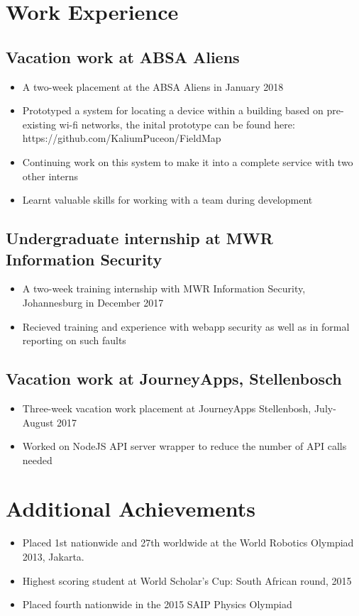 \documentclass[12pt,a4paper,notitlepage]{article}
\begin{document}
\section*{Work Experience}

\subsection*{Vacation work at ABSA Aliens}
\begin{itemize}
\item A two-week placement at the ABSA Aliens in January 2018
\item Prototyped a system for locating a device within a building based on pre-existing wi-fi networks, the inital prototype can be found here: https://github.com/KaliumPuceon/FieldMap
\item Continuing work on this system to make it into a complete service with two other interns
\item Learnt valuable skills for working with a team during development
\end{itemize}

\subsection*{Undergraduate internship at MWR Information Security}
\begin{itemize}
\item A two-week training internship with MWR Information Security, Johannesburg in December 2017
\item Recieved training and experience with webapp security as well as in formal reporting on such faults
\end{itemize}

\subsection*{Vacation work at JourneyApps, Stellenbosch}
\begin{itemize}
\item Three-week vacation work placement at JourneyApps Stellenbosh, July-August 2017
\item Worked on NodeJS API server wrapper to reduce the number of API calls needed
\end{itemize}

\section*{Additional Achievements}
\begin{itemize}
\item Placed 1st nationwide and 27th worldwide at the World Robotics Olympiad 2013, Jakarta.
\item Highest scoring student at World Scholar's Cup: South African round, 2015
\item Placed fourth nationwide in the 2015 SAIP Physics Olympiad
\end{itemize}
\end{document}
